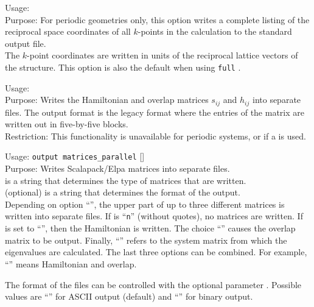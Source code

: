 {
  \noindent
  Usage:   \\[1.0ex]
  Purpose: For periodic geometries only, this option writes a complete
  listing of the reciprocal space coordinates of all $k$-points in the
  calculation to the standard output file. \\
}
The $k$-point coordinates are written in units of the reciprocal
lattice vectors of the structure. This option is also the default when
using  \texttt{full} .

{
  \noindent
  Usage:   \\[1.0ex]
  Purpose: Writes the Hamiltonian and overlap matrices $s_{ij}$ and
  $h_{ij}$ into separate files. The output format is the legacy format
  where the entries of the matrix are written out in five-by-five
  blocks. \\[1.0ex]
  Restriction: This functionality is unavailable for periodic systems,
    or if a  is used. \\[1.0ex]
}

{
  \noindent
  Usage: \texttt{output matrices\_parallel}  []
  \\[1.0ex]
  Purpose: Writes Scalapack/Elpa matrices into separate files.  \\[1.0ex]
   is a string that determines the type of matrices that are
  written.  \\[1.0ex]
   (optional) is a string that determines the format of the
  output.  \\
}
Depending on option ``'', the upper part of up to three different
matrices is written into separate files. If  is ``\texttt{n}''
(without quotes), no matrices are written. If  is set to
``'', then the Hamiltonian is written. The choice ``''
causes the overlap matrix to be output. Finally, ``'' refers to the
system matrix from which the eigenvalues are calculated. The last three options
can be combined. For example, ``'' means Hamiltonian and overlap.

The format of the files can be controlled with the optional parameter
. Possible values are ``'' for ASCII output (default)
and ``'' for binary output.


